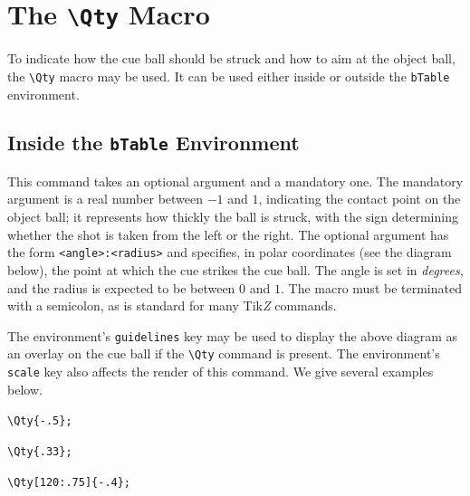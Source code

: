 \documentclass[11pt,a4paper]{ltxdoc}
\def\bluett#1{{\color{blue}\texttt{#1}}}
\begin{document}
\section{The \bluett{\textbackslash Qty} Macro}

To indicate how the cue ball should be struck and how to aim at the object ball, the \bluett{\textbackslash Qty} macro may be used. It can be used either inside or outside the \bluett{bTable} environment.

\subsection{Inside the \bluett{bTable} Environment}

This command takes an optional argument and a mandatory one. The mandatory argument is a real number between $-1$ and $1$, indicating the contact point on the object ball; it represents how thickly the ball is struck, with the sign determining whether the shot is taken from the left or the right. The optional argument has the form \texttt{<angle>:<radius>} and specifies, in polar coordinates (see the diagram below), the point at which the cue strikes the cue ball. The angle is set in \textit{degrees}, and the radius is expected to be between $0$ and $1$. The macro must be terminated with a semicolon, as is standard for many Tik\textit{Z} commands.

\begin{center}
\end{center}

The environment's \bluett{guidelines} key may be used to display the above diagram as an overlay on the cue ball if the \bluett{\textbackslash Qty} command is present. The environment's \bluett{scale} key also affects the render of this command. We give several examples below.\medskip

\begin{minipage}{.33\linewidth}\centering
    \par
    {\color{blue}\verb|\Qty{-.5};|}
\end{minipage}
\begin{minipage}{.34\linewidth}\centering
    \par
    {\color{blue}\verb|\Qty{.33};|}
\end{minipage}
\begin{minipage}{.33\linewidth}\centering
    \par
    {\color{blue}\verb|\Qty[120:.75]{-.4};|}
\end{minipage}
\bigskip
\end{document}
